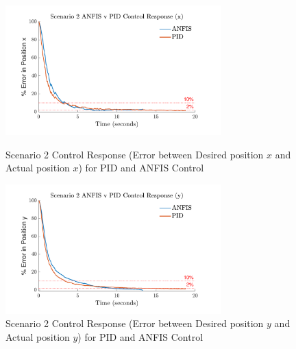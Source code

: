 \begin{figure}[H]
    \centering
    \begin{minipage}[b]{0.45\textwidth}
        \centering
        \includegraphics[height=5cm,keepaspectratio]{img/Scenario 2 Error in x Position.pdf}
        \caption{Scenario 2 Control Response (Error between Desired position $x$ and Actual position $x$) for PID and ANFIS Control}
        \label{fig:Response2x}
    \end{minipage}
    \hfill
    \begin{minipage}[b]{0.45\textwidth}
        \centering
        \includegraphics[height=5cm,keepaspectratio]{img/Scenario 2 Error in y Position.pdf}
        \caption{Scenario 2 Control Response (Error between Desired position $y$ and Actual position $y$) for PID and ANFIS Control}
        \label{fig:Response2y}
    \end{minipage}
\end{figure}

